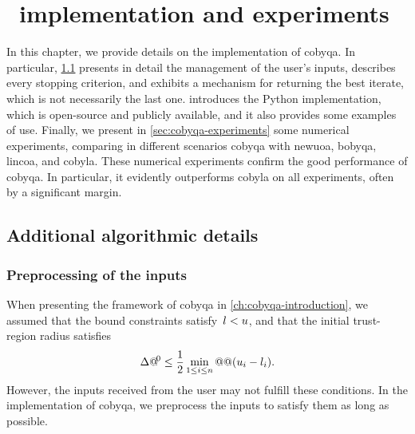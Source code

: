 %
%
%
\chapter{ \textemdash\ implementation and experiments}
\label{ch:cobyqa-implementation}

In this chapter, we provide details on the implementation of \gls{cobyqa}.
In particular, \cref{sec:implementation-details} presents in detail the management of the user's inputs, describes every stopping criterion, and exhibits a mechanism for returning the best iterate, which is not necessarily the last one.
 introduces the Python implementation, which is open-source and publicly available, and it also provides some examples of use.
Finally, we present in \cref{sec:cobyqa-experiments} some numerical experiments, comparing in different scenarios \gls{cobyqa} with \gls{newuoa}, \gls{bobyqa}, \gls{lincoa}, and \gls{cobyla}.
These numerical experiments confirm the good performance of \gls{cobyqa}.
In particular, it evidently outperforms \gls{cobyla} on all experiments, often by a significant margin.

\section{Additional algorithmic details}
\label{sec:implementation-details}

\subsection{Preprocessing of the inputs}

When presenting the framework of \gls{cobyqa} in \cref{ch:cobyqa-introduction}, we assumed that the bound constraints satisfy~$l < u$, and that the initial trust-region radius satisfies
\begin{equation}
    \label{eq:initial-trust-region-radius-condition}
    \rad[0] \le \frac{1}{2} \min_{1 \le i \le n} @@ (\xu_i - \xl_i).
\end{equation}
However, the inputs received from the user may not fulfill these conditions.
In the implementation of \gls{cobyqa}, we preprocess the inputs to satisfy them as long as possible.

